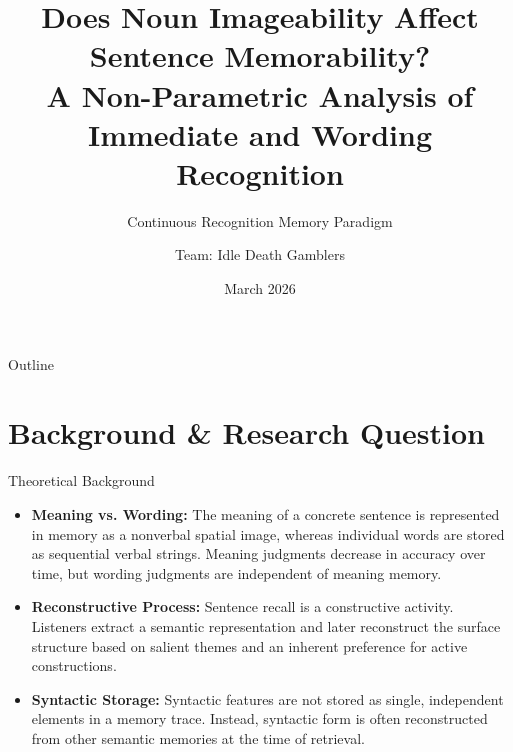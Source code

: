 \documentclass[aspectratio=169, 10pt]{beamer}
\title[Sentence Memorability]{%
  \textbf{Does Noun Imageability Affect Sentence Memorability?}\\[4pt]
  \normalsize A Non-Parametric Analysis of Immediate and Wording Recognition}
\subtitle{Continuous Recognition Memory Paradigm}
\author{Team: Idle Death Gamblers}
\institute{Semester 6 Research Methods}
\date{March 2026}
\begin{document}
\begin{frame}
  \titlepage
\end{frame}

\begin{frame}{Outline}
  \tableofcontents[hideallsubsections]
\end{frame}

\section{Background \& Research Question}

\begin{frame}{Theoretical Background}
  \begin{itemize}
    \item \textbf{Meaning vs. Wording:} The meaning of a concrete sentence is represented in memory as a nonverbal spatial image, whereas individual words are stored as sequential verbal strings. Meaning judgments decrease in accuracy over time, but wording judgments are independent of meaning memory.
    \item \textbf{Reconstructive Process:} Sentence recall is a constructive activity. Listeners extract a semantic representation and later reconstruct the surface structure based on salient themes and an inherent preference for active constructions.
    \item \textbf{Syntactic Storage:} Syntactic features are not stored as single, independent elements in a memory trace. Instead, syntactic form is often reconstructed from other semantic memories at the time of retrieval.
  \end{itemize}
\end{frame}
\end{document}
